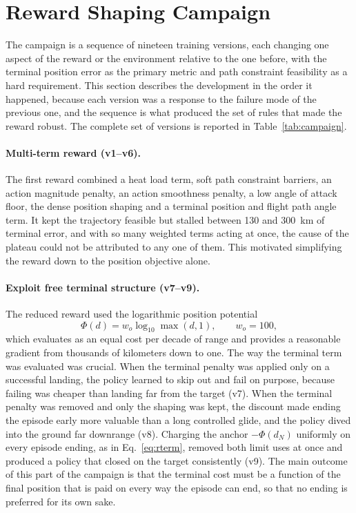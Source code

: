 \documentclass[11pt]{article}
\begin{document}
\section{Reward Shaping Campaign}
\label{sec:campaign}

The campaign is a sequence of nineteen training versions, each changing one aspect of the reward or the environment relative to the one before, with the terminal position error as the primary metric and path constraint feasibility as a hard requirement. This section describes the development in the order it happened, because each version was a response to the failure mode of the previous one, and the sequence is what produced the set of rules that made the reward robust. The complete set of versions is reported in Table~\ref{tab:campaign}.

\paragraph{Multi-term reward (v1--v6).} The first reward combined a heat load term, soft path constraint barriers, an action magnitude penalty, an action smoothness penalty, a low angle of attack floor, the dense position shaping and a terminal position and flight path angle term. It kept the trajectory feasible but stalled between \SI{130}{} and \SI{300}{\kilo\meter} of terminal error, and with so many weighted terms acting at once, the cause of the plateau could not be attributed to any one of them. This motivated simplifying the reward down to the position objective alone.

\paragraph{Exploit free terminal structure (v7--v9).} The reduced reward used the logarithmic position potential
\begin{equation}
\Phi(d) = w_o \log_{10}\!\max(d,1), \qquad w_o = 100,
\label{eq:phi_log}
\end{equation}
which evaluates as an equal cost per decade of range and provides a reasonable gradient from thousands of kilometers down to one. The way the terminal term was evaluated was crucial. When the terminal penalty was applied only on a successful landing, the policy learned to skip out and fail on purpose, because failing was cheaper than landing far from the target (v7). When the terminal penalty was removed and only the shaping was kept, the discount made ending the episode early more valuable than a long controlled glide, and the policy dived into the ground far downrange (v8). Charging the anchor $-\Phi(d_N)$ uniformly on every episode ending, as in Eq.~\eqref{eq:rterm}, removed both limit uses at once and produced a policy that closed on the target consistently (v9). The main outcome of this part of the campaign is that the terminal cost must be a function of the final position that is paid on every way the episode can end, so that no ending is preferred for its own sake.
\end{document}

